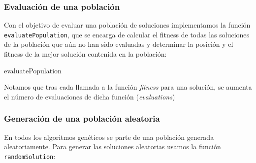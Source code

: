 \documentclass[10pt,a4paper]{article}
\begin{document}
	\subsubsection{Evaluación de una población}
	Con el objetivo de evaluar una población de soluciones implementamos la función \lstinline|evaluatePopulation|, que se encarga de calcular el fitness de todas las soluciones de la población que aún no han sido evaluadas y determinar la posición y el fitness de la mejor solución contenida en la población:
	
		\begin{algorithm}[H]
		\caption{\sc evaluatePopulation}
	\end{algorithm}
	
	Notamos que tras cada llamada a la función \textit{fitness} para una solución, se aumenta el número de evaluaciones de dicha función (\textit{evaluations})
	
	\subsubsection{Generación de una población aleatoria}
	En todos los algoritmos genéticos se parte de una población generada aleatoriamente. Para generar las soluciones aleatorias usamos la función \lstinline|randomSolution|:
	
\end{document}
